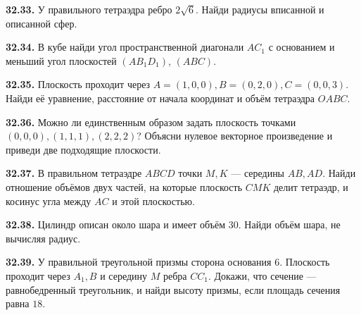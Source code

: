 \noindent\begin{minipage}[t]{\linewidth}\textbf{32.33.} У правильного тетраэдра ребро \(2\sqrt6\). Найди радиусы вписанной и описанной сфер.\par\end{minipage}\par
\noindent\begin{minipage}[t]{\linewidth}\textbf{32.34.} В кубе найди угол пространственной диагонали \(AC_1\) с основанием и меньший угол плоскостей \((AB_1D_1)\), \((ABC)\).\par\end{minipage}\par
\noindent\begin{minipage}[t]{\linewidth}\textbf{32.35.} Плоскость проходит через \(A=(1,0,0),B=(0,2,0),C=(0,0,3)\). Найди её уравнение, расстояние от начала координат и объём тетраэдра \(OABC\).\par\end{minipage}\par
\noindent\begin{minipage}[t]{\linewidth}\textbf{32.36.}\starmark{} Можно ли единственным образом задать плоскость точками \((0,0,0),(1,1,1),(2,2,2)\)? Объясни нулевое векторное произведение и приведи две подходящие плоскости.\par\end{minipage}\par
\noindent\begin{minipage}[t]{\linewidth}\textbf{32.37.}\starmark{} В правильном тетраэдре \(ABCD\) точки \(M,K\) — середины \(AB,AD\). Найди отношение объёмов двух частей, на которые плоскость \(CMK\) делит тетраэдр, и косинус угла между \(AC\) и этой плоскостью.\par\end{minipage}\par
\noindent\begin{minipage}[t]{\linewidth}\textbf{32.38.} Цилиндр описан около шара и имеет объём \(30\). Найди объём шара, не вычисляя радиус.\par\end{minipage}\par
\noindent\begin{minipage}[t]{\linewidth}\textbf{32.39.}\starmark{} У правильной треугольной призмы сторона основания \(6\). Плоскость проходит через \(A_1,B\) и середину \(M\) ребра \(CC_1\). Докажи, что сечение — равнобедренный треугольник, и найди высоту призмы, если площадь сечения равна \(18\).\par\end{minipage}\par
